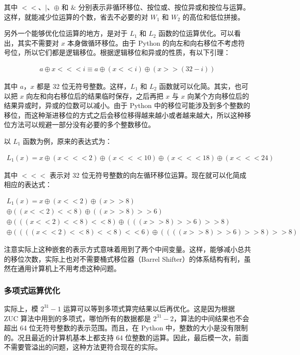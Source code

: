 \documentclass[a4paper, 10pt]{article}
\begin{document}
其中 $ << $、$ | $、$ \oplus $ 和 $ \& $ 分别表示非循环移位、按位或、按位异或和按位与运算。这样，就能减少位运算的个数，省去不必要的对 $ W_1 $ 和 $ W_2 $ 的高位和低位拼接。

另外一个能够优化位运算的地方，是对于 $ L_1 $ 和 $ L_2 $ 函数的位运算优化。可以看出，其实不需要对 $ x $ 本身做循环移位。由于 Python 的向左和向右移位不考虑符号位，所以它们都是逻辑移位。根据逻辑移位和异或的性质，有以下引理：

\begin{gather*}
a \oplus x <<< i \equiv a \oplus (x << i) \oplus (x >> (32 - i))
\end{gather*}

其中 $ a $，$ x $ 都是 32 位无符号整数。这样，$ L_1 $ 和 $ L_2 $ 函数就可以化简。其实，也可以把 $ x $ 向左和向右移位后的结果临时保存，之后再把 $ x $ 与 $ x $ 向某个方向移位后的结果异或时，异或的位数可以减小。由于 Python 中的移位可能涉及到多个整数的移位，而这种渐进移位的方式之后会移位移得越来越小或者越来越大，所以这种移位方法可以规避一部分没有必要的多个整数移位。

以 $ L_1 $ 函数为例，原来的表达式为：

\begin{gather*}
L_1(x) = x \oplus (x <<< 2) \oplus (x <<< 10) \oplus (x <<< 18) \oplus (x <<< 24)
\end{gather*}

其中 $ <<< $ 表示对 32 位无符号整数的向左循环移位运算。现在就可以化简成相应的表达式：

\begin{gather*}
L_1(x) = x \oplus (x << 2) \oplus (x >> 8) \\ 
\oplus ((x << 2) << 8) \oplus ((x >> 8) >> 6) \\ 
\oplus (((x << 2) << 8) << 8) \oplus (((x >> 8) >> 6) >> 8) \\ 
\oplus ((((x << 2) << 8) << 8) << 6) \oplus ((((x >> 8) >> 6) >> 8) >> 8)
\end{gather*}

注意实际上这种嵌套的表示方式意味着用到了两个中间变量。这样，能够减小总共的移位次数，实际上也对不需要桶式移位器（Barrel Shifter）的体系结构有利，虽然在通用计算机上不用考虑这种问题。

\subsubsection*{多项式运算优化}

实际上，模 $ 2^31 - 1 $ 运算可以等到多项式算完结果以后再优化。这是因为根据 ZUC 算法中用到的多项式，哪怕所有的数据都是 $ 2^31 - 2 $，算法的中间结果也不会超出 64 位无符号整数的表示范围。而且，在 Python 中，整数的大小是没有限制的。况且最近的计算机基本上都支持 64 位整数的运算。因此，最后模一次，前面不需要管溢出的问题，这种方法更符合现在的实际。
\end{document}
